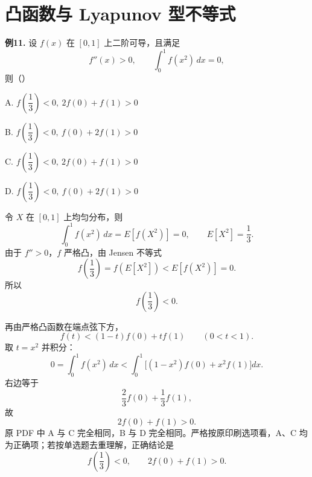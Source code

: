 \section{凸函数与 Lyapunov 型不等式}

\begin{problemblock}
\textbf{例11.} 设 \(f(x)\) 在 \([0,1]\) 上二阶可导，且满足
\[
f''(x)>0,\qquad \int_0^1f(x^2)\,dx=0,
\]
则（\quad）

A. \(f\left(\dfrac13\right)<0,\ 2f(0)+f(1)>0\)

B. \(f\left(\dfrac13\right)<0,\ f(0)+2f(1)>0\)

C. \(f\left(\dfrac13\right)<0,\ 2f(0)+f(1)>0\)

D. \(f\left(\dfrac13\right)<0,\ f(0)+2f(1)>0\)
\end{problemblock}
\begin{solutionblock}
令 \(X\) 在 \([0,1]\) 上均匀分布，则
\[
\int_0^1 f(x^2)\,dx=E[f(X^2)]=0,
\qquad E[X^2]=\frac13.
\]
由于 \(f''>0\)，\(f\) 严格凸，由 Jensen 不等式
\[
f\left(\frac13\right)=f(E[X^2])<E[f(X^2)]=0.
\]
所以
\[
f\left(\frac13\right)<0.
\]

再由严格凸函数在端点弦下方，
\[
f(t)<(1-t)f(0)+tf(1)\qquad(0<t<1).
\]
取 \(t=x^2\) 并积分：
\[
0=\int_0^1f(x^2)\,dx
<
\int_0^1\bigl[(1-x^2)f(0)+x^2f(1)\bigr]dx.
\]
右边等于
\[
\frac23f(0)+\frac13f(1),
\]
故
\[
2f(0)+f(1)>0.
\]
原 PDF 中 A 与 C 完全相同，B 与 D 完全相同。严格按原印刷选项看，A、C 均为正确项；若按单选题去重理解，正确结论是
\[
f\left(\frac13\right)<0,\qquad 2f(0)+f(1)>0.
\]
\end{solutionblock}

